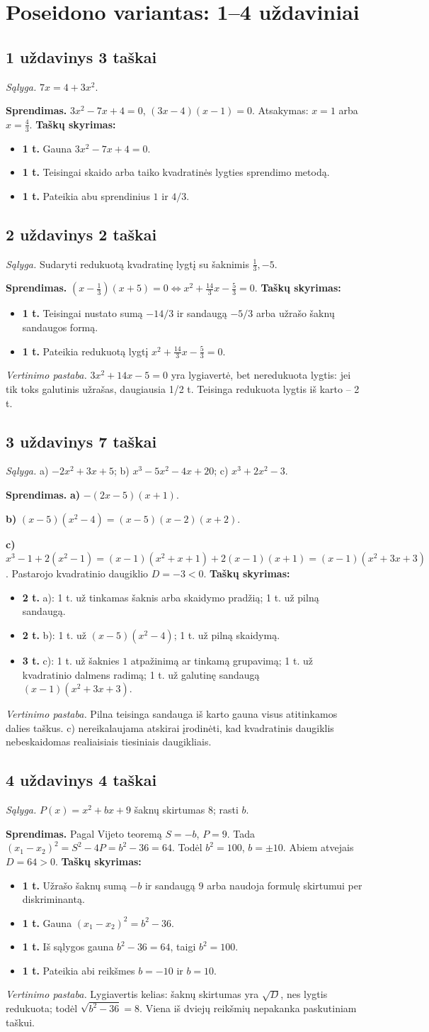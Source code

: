 \documentclass[11pt,a4paper]{article}
\newcommand{\uzd}[3]{\subsection*{#1 uždavinys \hfill #2 taškai}\textit{Sąlyga.} #3\par}
\newcommand{\kriterijai}{\textbf{Taškų skyrimas:}}
\newcommand{\balas}[2]{\item \textbf{#1 t.} #2}
\begin{document}
\section*{Poseidono variantas: 1--4 uždaviniai}
\uzd{1}{3}{$7x=4+3x^2$.}
\textbf{Sprendimas.} $3x^2-7x+4=0$, $(3x-4)(x-1)=0$. Atsakymas: $x=1$ arba $x=\frac43$.
\kriterijai\begin{itemize}
\balas{1}{Gauna $3x^2-7x+4=0$.}
\balas{1}{Teisingai skaido arba taiko kvadratinės lygties sprendimo metodą.}
\balas{1}{Pateikia abu sprendinius $1$ ir $4/3$.}
\end{itemize}
\uzd{2}{2}{Sudaryti redukuotą kvadratinę lygtį su šaknimis $\frac13,-5$.}
\textbf{Sprendimas.} $(x-\frac13)(x+5)=0\iff x^2+\frac{14}{3}x-\frac53=0$.
\kriterijai\begin{itemize}
\balas{1}{Teisingai nustato sumą $-14/3$ ir sandaugą $-5/3$ arba užrašo šaknų sandaugos formą.}
\balas{1}{Pateikia redukuotą lygtį $x^2+\frac{14}{3}x-\frac53=0$.}
\end{itemize}
\textit{Vertinimo pastaba.} $3x^2+14x-5=0$ yra lygiavertė, bet neredukuota lygtis: jei tik toks galutinis užrašas, daugiausia 1/2 t. Teisinga redukuota lygtis iš karto -- 2 t.
\uzd{3}{7}{a) $-2x^2+3x+5$; b) $x^3-5x^2-4x+20$; c) $x^3+2x^2-3$.}
\textbf{Sprendimas.} \textbf{a)} $-(2x-5)(x+1)$.\par\textbf{b)} $(x-5)(x^2-4)=(x-5)(x-2)(x+2)$.\par\textbf{c)} $x^3-1+2(x^2-1)=(x-1)(x^2+x+1)+2(x-1)(x+1)=(x-1)(x^2+3x+3)$. Pastarojo kvadratinio daugiklio $D=-3<0$.
\kriterijai\begin{itemize}
\balas{2}{a): 1 t. už tinkamas šaknis arba skaidymo pradžią; 1 t. už pilną sandaugą.}
\balas{2}{b): 1 t. už $(x-5)(x^2-4)$; 1 t. už pilną skaidymą.}
\balas{3}{c): 1 t. už šaknies $1$ atpažinimą ar tinkamą grupavimą; 1 t. už kvadratinio dalmens radimą; 1 t. už galutinę sandaugą $(x-1)(x^2+3x+3)$.}
\end{itemize}
\textit{Vertinimo pastaba.} Pilna teisinga sandauga iš karto gauna visus atitinkamos dalies taškus. c) nereikalaujama atskirai įrodinėti, kad kvadratinis daugiklis nebeskaidomas realiaisiais tiesiniais daugikliais.
\uzd{4}{4}{$P(x)=x^2+bx+9$ šaknų skirtumas $8$; rasti $b$.}
\textbf{Sprendimas.} Pagal Vijeto teoremą $S=-b$, $P=9$. Tada $(x_1-x_2)^2=S^2-4P=b^2-36=64$. Todėl $b^2=100$, $b=\pm10$. Abiem atvejais $D=64>0$.
\kriterijai\begin{itemize}
\balas{1}{Užrašo šaknų sumą $-b$ ir sandaugą $9$ arba naudoja formulę skirtumui per diskriminantą.}
\balas{1}{Gauna $(x_1-x_2)^2=b^2-36$.}
\balas{1}{Iš sąlygos gauna $b^2-36=64$, taigi $b^2=100$.}
\balas{1}{Pateikia abi reikšmes $b=-10$ ir $b=10$.}
\end{itemize}
\textit{Vertinimo pastaba.} Lygiavertis kelias: šaknų skirtumas yra $\sqrt D$, nes lygtis redukuota; todėl $\sqrt{b^2-36}=8$. Viena iš dviejų reikšmių nepakanka paskutiniam taškui.
\newpage
\end{document}
